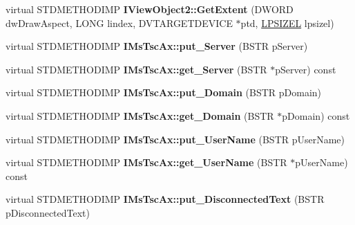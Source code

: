 \begin{DoxyCompactItemize}
\item 
\mbox{\label{class_s_e_a_l_e_d___adf044df174661bb60e7bd20d5bf23df1}} 
virtual S\+T\+D\+M\+E\+T\+H\+O\+D\+I\+MP {\bfseries I\+View\+Object2\+::\+Get\+Extent} (D\+W\+O\+RD dw\+Draw\+Aspect, L\+O\+NG lindex, D\+V\+T\+A\+R\+G\+E\+T\+D\+E\+V\+I\+CE $\ast$ptd, \hyperlink{structtag_s_i_z_e}{L\+P\+S\+I\+Z\+EL} lpsizel)
\item 
\mbox{\label{class_s_e_a_l_e_d___aac456f9c88ba4bc53ef54aae39474427}} 
virtual S\+T\+D\+M\+E\+T\+H\+O\+D\+I\+MP {\bfseries I\+Ms\+Tsc\+Ax\+::put\+\_\+\+Server} (B\+S\+TR p\+Server)
\item 
\mbox{\label{class_s_e_a_l_e_d___abe936db91d5f53d3e5c66367809bfbdb}} 
virtual S\+T\+D\+M\+E\+T\+H\+O\+D\+I\+MP {\bfseries I\+Ms\+Tsc\+Ax\+::get\+\_\+\+Server} (B\+S\+TR $\ast$p\+Server) const
\item 
\mbox{\label{class_s_e_a_l_e_d___a6a24f65f1cf580f332401699ee2d6a7e}} 
virtual S\+T\+D\+M\+E\+T\+H\+O\+D\+I\+MP {\bfseries I\+Ms\+Tsc\+Ax\+::put\+\_\+\+Domain} (B\+S\+TR p\+Domain)
\item 
\mbox{\label{class_s_e_a_l_e_d___a215d4bde16cf41a0be214ac1c49aef84}} 
virtual S\+T\+D\+M\+E\+T\+H\+O\+D\+I\+MP {\bfseries I\+Ms\+Tsc\+Ax\+::get\+\_\+\+Domain} (B\+S\+TR $\ast$p\+Domain) const
\item 
\mbox{\label{class_s_e_a_l_e_d___ae1a6c4b4b6f9bd66f75f3eba3fa87716}} 
virtual S\+T\+D\+M\+E\+T\+H\+O\+D\+I\+MP {\bfseries I\+Ms\+Tsc\+Ax\+::put\+\_\+\+User\+Name} (B\+S\+TR p\+User\+Name)
\item 
\mbox{\label{class_s_e_a_l_e_d___a3563096bd90b876e67ce78e7c547f94e}} 
virtual S\+T\+D\+M\+E\+T\+H\+O\+D\+I\+MP {\bfseries I\+Ms\+Tsc\+Ax\+::get\+\_\+\+User\+Name} (B\+S\+TR $\ast$p\+User\+Name) const
\item 
\mbox{\label{class_s_e_a_l_e_d___a715529ad787090ad68cf99684a3b358b}} 
virtual S\+T\+D\+M\+E\+T\+H\+O\+D\+I\+MP {\bfseries I\+Ms\+Tsc\+Ax\+::put\+\_\+\+Disconnected\+Text} (B\+S\+TR p\+Disconnected\+Text)
\item 

\end{DoxyCompactItemize}
